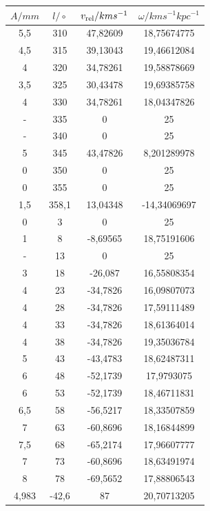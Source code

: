 \documentclass[12pt]{article}
\begin{document}
\begin{minipage}{.5\textwidth}
    \vspace*{-8.15cm}\begin{tabular}{|c|c|c|c}
        $A/ mm$ & $l /\circ$ & $v_{\textnormal{rel}} / kms^{-1}$ & $\omega / kms^{-1}kpc^{-1}$ \\ \hline
        5,5 & 310 & 47,82609 & 18,75674775\\
        4,5 & 315 & 39,13043 & 19,46612084 \\ 
        4 & 320 & 34,78261 & 19,58878669 \\ 
        3,5 & 325 & 30,43478 & 19,69385758 \\ 
        4 & 330 & 34,78261 & 18,04347826 \\ 
        - & 335 & 0 & 25 \\ 
        - & 340 & 0 & 25 \\ 
        5 & 345 & 43,47826 & 8,201289978 \\ 
        0 & 350 & 0 & 25 \\ 
        0 & 355 & 0 & 25 \\ 
        1,5 & 358,1 & 13,04348 & -14,34069697 \\ 
        0 & 3 & 0 & 25 \\ 
        1 & 8 & -8,69565 & 18,75191606 \\ 
        - & 13 & 0 & 25 \\ 
        3 & 18 & -26,087 & 16,55808354 \\ 
        4 & 23 & -34,7826 & 16,09807073 \\ 
        4 & 28 & -34,7826 & 17,59111489 \\ 
        4 & 33 & -34,7826 & 18,61364014 \\ 
        4 & 38 & -34,7826 & 19,35036784 \\ 
        5 & 43 & -43,4783 & 18,62487311 \\ 
        6 & 48 & -52,1739 & 17,9793075 \\ 
        6 & 53 & -52,1739 & 18,46711831 \\ 
        6,5 & 58 & -56,5217 & 18,33507859 \\ 
        7 & 63 & -60,8696 & 18,16844899 \\ 
        7,5 & 68 & -65,2174 & 17,96607777 \\ 
        7 & 73 & -60,8696 & 18,63491974 \\ 
        8 & 78 & -69,5652 & 17,88806543 \\ 
        4,983 & -42,6 & 87 & 20,70713205 \\ 
    \end{tabular}
\end{minipage}\\
\end{document}
